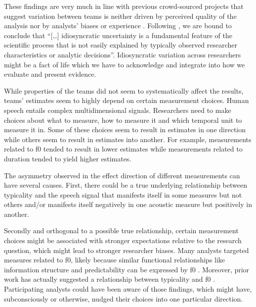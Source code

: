 \documentclass[Review,times,sageh]{sagej}
\begin{document}
These findings are very much in line with previous crowd-sourced projects that suggest variation between teams is neither driven by perceived quality of the analysis nor by analysts' biases or experience \citep[e.g.,][]{silberzahn2018many, breznau2021observing}.
Following \citet[p.~9]{breznau2021observing}, we are bound to conclude that ``{[}\ldots{]} idiosyncratic uncertainty is a fundamental feature of the scientific process that is not easily explained by typically observed researcher characteristics or analytic decisions''.
Idiosyncratic variation across researchers might be a fact of life which we have to acknowledge and integrate into how we evaluate and present evidence.

While properties of the teams did not seem to systematically affect the results, teams' estimates seem to highly depend on certain measurement choices.
Human speech entails complex multidimensional signals.
Researchers need to make choices about what to measure, how to measure it and which temporal unit to measure it in.
Some of these choices seem to result in estimates in one direction while others seem to result in estimates into another.
For example, measurements related to f0 tended to result in lower estimates while measurements related to duration tended to yield higher estimates.

The asymmetry observed in the effect direction of different measurements can have several causes.
First, there could be a true underlying relationship between typicality and the speech signal that manifests itself in some measures but not others and/or manifests itself negatively in one acoustic measure but positively in another.

Secondly and orthogonal to a possible true relationship, certain measurement choices might be associated with stronger expectations relative to the research question, which might lead to stronger researcher biases.
Many analysts targeted measures related to f0, likely because similar functional relationships like information structure and predictability can be expressed by f0 \citep[e.g.][]{grice2017integrating, turnbull2017role}.
Moreover, prior work has actually suggested a relationship between typicality and f0 \citep[e.g.][]{dimitrova2008prosodic, dimitrova2009did}.
Participating analysts could have been aware of those findings, which might have, subconsciously or otherwise, nudged their choices into one particular direction.
\end{document}
